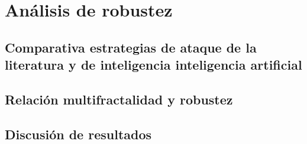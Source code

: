 \section{Análisis de robustez}

\subsection{Comparativa estrategias de ataque de la literatura y de inteligencia inteligencia artificial}

\subsection{Relación multifractalidad y robustez}

\subsection{Discusión de resultados}